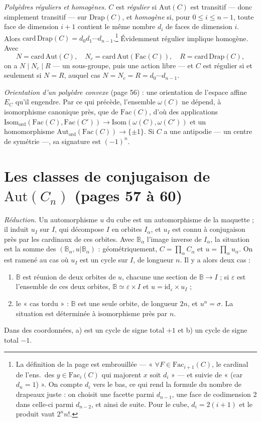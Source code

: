 \documentclass[11pt,a4paper]{article}
\begin{document}
\emph{Polyèdres réguliers et homogènes.} $C$ est \emph{régulier} si
$\mathrm{Aut}(C)$ est transitif --- donc simplement transitif --- sur
$\mathrm{Drap}(C)$, et \emph{homogène} si, pour $0 \leqslant i \leqslant n -
1$, toute face de dimension $i+1$ contient le même nombre $d_i$ de faces de
dimension $i$. Alors $\mathrm{card}\, \mathrm{Drap}(C) = d_0 d_1 \cdots
d_{n-1}$.\footnote{La définition de la page est embrouillée --- « $\forall F
\in \mathrm{Fac}_{i+1}(C)$, le cardinal de l'ens.\ des $y \in
\mathrm{Fac}_i(C)$ qui majorent $x$ soit $d_i$ » --- et suivie de « (car $d_n
= 1$) ». On compte $d_i$ vers le bas, ce qui rend la formule du nombre de
drapeaux juste : on choisit une facette parmi $d_{n-1}$, une face de
codimension 2 dans celle-ci parmi $d_{n-2}$, et ainsi de suite. Pour le cube,
$d_i = 2(i+1)$ et le produit vaut $2^n n!$.} Évidemment régulier implique
homogène. Avec
\[
  N = \mathrm{card}\, \mathrm{Aut}(C), \quad N_c = \mathrm{card}\,
  \mathrm{Aut}(\mathrm{Fac}(C)), \quad R = \mathrm{card}\, \mathrm{Drap}(C) ,
\]
on a $N \mid N_c \mid R$ --- un sous-groupe, puis une action libre --- et $C$
est régulier si et seulement si $N = R$, auquel cas $N = N_c = R = d_0 \cdots
d_{n-1}$.

\emph{Orientation d'un polyèdre convexe} (page 56) : une orientation de
l'espace affine $E_C$ qu'il engendre. Par ce qui précède, l'ensemble
$\omega(C)$ ne dépend, à isomorphisme canonique près, que de
$\mathrm{Fac}(C)$, d'où des applications $\mathrm{Isom}_{\mathrm{ord}}(\mathrm{Fac}(C),
\mathrm{Fac}(C')) \to \mathrm{Isom}(\omega(C), \omega(C'))$ et un
homomorphisme $\mathrm{Aut}_{\mathrm{ord}}(\mathrm{Fac}(C)) \to \{\pm 1\}$.
Si $C$ a une antipodie --- un centre de symétrie ---, sa signature est
$(-1)^n$.

\section*{Les classes de conjugaison de $\mathrm{Aut}(C_n)$ (pages 57 à 60)}

\emph{Réduction.} Un automorphisme $u$ du cube est un automorphisme de la
maquette ; il induit $u_I$ sur $I$, qui décompose $I$ en orbites $I_\alpha$,
et $u_I$ est connu à conjugaison près par les cardinaux de ces orbites. Avec
$\mathbb{B}_\alpha$ l'image inverse de $I_\alpha$, la situation est la somme
des $(\mathbb{B}_\alpha, u|\mathbb{B}_\alpha)$ : géométriquement, $C =
\prod_\alpha C_\alpha$ et $u = \prod_\alpha u_\alpha$. On est ramené au cas où
$u_I$ est un cycle sur $I$, de longueur $n$. Il y a alors deux cas :
\begin{enumerate}
  \item[a)] $\mathbb{B}$ est réunion de deux orbites de $u$, chacune une
  section de $\mathbb{B} \to I$ ; si $\varepsilon$ est l'ensemble de ces deux
  orbites, $\mathbb{B} \simeq \varepsilon \times I$ et $u = \mathrm{id}_\varepsilon
  \times u_I$ ;
  \item[b)] le « cas tordu » : $\mathbb{B}$ est une seule orbite, de longueur
  $2n$, et $u^n = \sigma$. La situation est déterminée à isomorphisme près
  par $n$.
\end{enumerate}
Dans des coordonnées, a) est un cycle de signe total $+1$ et b) un cycle de
signe total $-1$.
\end{document}
